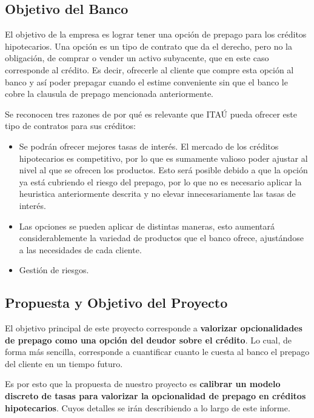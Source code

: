 \subsection{Objetivo del Banco}

\qquad El objetivo de la empresa es lograr tener una opción de prepago 
para los créditos hipotecarios. Una opción es un tipo de contrato que da 
el derecho, pero no la obligación, de comprar o vender un activo 
subyacente, que en este caso corresponde al crédito. Es decir, ofrecerle 
al cliente que compre esta opción al banco y así poder prepagar cuando 
el estime conveniente sin que el banco le cobre la clausula de prepago 
mencionada anteriormente.

\qquad Se reconocen tres razones de por qué es relevante que ITAÚ pueda ofrecer este tipo de contratos para sus créditos:

\begin{itemize}
    \item Se podrán ofrecer mejores tasas de interés. El mercado de los 
    créditos hipotecarios es competitivo, por lo que es sumamente 
    valioso poder ajustar al nivel al que se ofrecen los productos. Esto 
    será posible debido a que la opción ya está cubriendo el riesgo del 
    prepago, por lo que no es necesario aplicar la heuristica 
    anteriormente descrita y no elevar innecesariamente las tasas de 
    interés.
    \item Las opciones se pueden aplicar de distintas maneras, esto aumentará considerablemente la variedad de productos que el banco 
    ofrece, ajustándose a las necesidades de cada cliente.
    \item Gestión de riesgos. 
\end{itemize}

\subsection{Propuesta y Objetivo del Proyecto}

\qquad El objetivo principal de este proyecto corresponde a \textbf{valorizar opcionalidades de prepago como una opción del deudor sobre el crédito}. Lo cual, de forma más sencilla, corresponde a cuantificar cuanto le cuesta al banco el prepago del cliente en un tiempo futuro.

\qquad Es por esto que la propuesta de nuestro proyecto es \textbf{calibrar un modelo discreto de tasas para valorizar la opcionalidad de prepago en créditos hipotecarios}. Cuyos detalles se irán describiendo a lo largo de este informe.